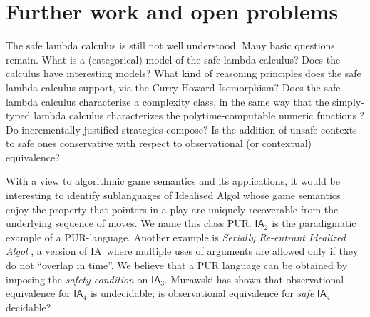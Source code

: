 \documentclass{llncs}
\newcommand\ialgol{\textsf{IA}}
\begin{document}


\section{Further work and open problems}

The safe lambda calculus is still not well understood. Many basic
questions remain. What is a (categorical) model of the safe lambda
calculus? Does the calculus have interesting models?  What kind of
reasoning principles does the safe lambda calculus support, via the
Curry-Howard Isomorphism? Does the safe lambda calculus characterize a complexity class, in the same way that the simply-typed lambda calculus characterizes the polytime-computable numeric functions \cite{DBLP:conf/tlca/LeivantM93}?  Do incrementally-justified strategies compose? Is the addition of
unsafe contexts to safe ones conservative with respect to observational (or contextual) equivalence?

With a view to algorithmic game semantics and its applications, it
would be interesting to identify sublanguages of Idealised Algol whose
game semantics enjoy the property that pointers in a play are uniquely
recoverable from the underlying sequence of moves. We name this class
PUR. $\ialgol_2$ is the paradigmatic example of a
PUR-language. Another example is \emph{Serially Re-entrant Idealized
  Algol} \cite{abramsky:mchecking_ia}, a version of \ialgol\ where
multiple uses of arguments are allowed only if they do not ``overlap
in time''.  We believe that a PUR language can be obtained by imposing
the \emph{safety condition} on $\ialgol_3$. Murawski \cite{Murawski2003} has
shown that observational equivalence for $\ialgol_4$ is
undecidable; is observational equivalence for \emph{safe} $\ialgol_4$
decidable?

%
%
\end{document}
